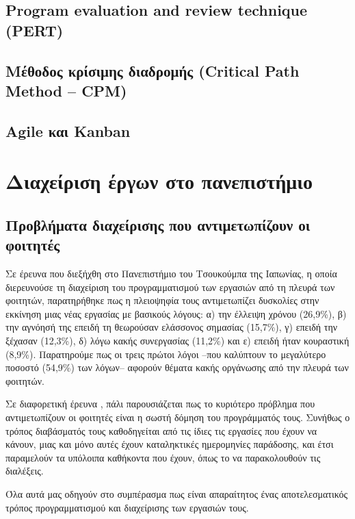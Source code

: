         \subsection{Program evaluation and review technique (PERT)}


        \subsection{Μέθοδος κρίσιμης διαδρομής (Critical Path Method -- CPM)}


        \subsection{Agile και Kanban}


    \section{Διαχείριση έργων στο πανεπιστήμιο}
        \subsection{Προβλήματα διαχείρισης που αντιμετωπίζουν οι φοιτητές}

            Σε έρευνα \cite{Fukuzawa2015} που διεξήχθη στο Πανεπιστήμιο του Τσουκούμπα της Ιαπωνίας, η οποία διερευνούσε τη διαχείριση του προγραμματισμού των εργασιών από τη πλευρά των φοιτητών, παρατηρήθηκε πως η πλειοψηφία τους αντιμετωπίζει δυσκολίες στην εκκίνηση μιας νέας εργασίας με βασικούς λόγους: α) την έλλειψη χρόνου (26,9\%), β) την αγνόησή της επειδή τη θεωρούσαν ελάσσονος σημασίας (15,7\%), γ) επειδή την ξέχασαν (12,3\%), δ) λόγω κακής συνεργασίας (11,2\%) και ε) επειδή ήταν κουραστική (8,9\%). Παρατηρούμε πως οι τρεις πρώτοι λόγοι --που καλύπτουν το μεγαλύτερο ποσοστό (54,9\%) των λόγων-- αφορούν θέματα κακής οργάνωσης από την πλευρά των φοιτητών.

            Σε διαφορετική έρευνα \cite{Trujillo2020}, πάλι παρουσιάζεται πως το κυριότερο πρόβλημα που αντιμετωπίζουν οι φοιτητές είναι η σωστή δόμηση του προγράμματός τους. Συνήθως ο τρόπος διαβάσματός τους καθοδηγείται από τις ίδιες τις εργασίες που έχουν να κάνουν, μιας και μόνο αυτές έχουν καταληκτικές ημερομηνίες παράδοσης, και έτσι παραμελούν τα υπόλοιπα καθήκοντα που έχουν, όπως το να παρακολουθούν τις διαλέξεις.

            Όλα αυτά μας οδηγούν στο συμπέρασμα πως είναι απαραίτητος ένας αποτελεσματικός τρόπος προγραμματισμού και διαχείρισης των εργασιών τους.

